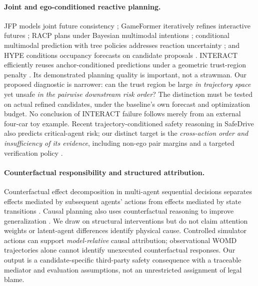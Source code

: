 \documentclass[10pt]{article}
\begin{document}
\paragraph{Joint and ego-conditioned reactive planning.}
JFP models joint future consistency \parencite{luo2023jfp}; GameFormer iteratively refines interactive futures \parencite{huang2023gameformer}; RACP plans under Bayesian multimodal intentions \parencite{mustafa2024racp}; conditional multimodal prediction with tree policies addresses reaction uncertainty \parencite{jang2026reaction}; and HYPE conditions occupancy forecasts on candidate proposals \parencite{yu2025hype}. INTERACT efficiently reuses anchor-conditioned predictions under a geometric trust-region penalty \parencite{distelzweig2026interact}. Its demonstrated planning quality is important, not a strawman. Our proposed diagnostic is narrower: can the trust region be large \emph{in trajectory space} yet unsafe \emph{in the pairwise downstream risk order}? The distinction must be tested on actual refined candidates, under the baseline's own forecast and optimization budget. No conclusion of INTERACT failure follows merely from an external four-car toy example. Recent trajectory-conditioned safety reasoning in SafeDrive also predicts critical-agent risk; our distinct target is the \emph{cross-action order and insufficiency of its evidence}, including non-ego pair margins and a targeted verification policy \parencite{kim2026safedrive}.

\paragraph{Counterfactual responsibility and structured attribution.}
Counterfactual effect decomposition in multi-agent sequential decisions separates effects mediated by subsequent agents' actions from effects mediated by state transitions \parencite{triantafyllou2024counterfactual}. Causal planning also uses counterfactual reasoning to improve generalization \parencite{xie2026causalplanner}. We draw on structural interventions but do not claim attention weights or latent-agent differences identify physical cause. Controlled simulator actions can support \emph{model-relative} causal attribution; observational WOMD trajectories alone cannot identify unexecuted counterfactual responses. Our output is a candidate-specific third-party safety consequence with a traceable mediator and evaluation assumptions, not an unrestricted assignment of legal blame.
\end{document}
